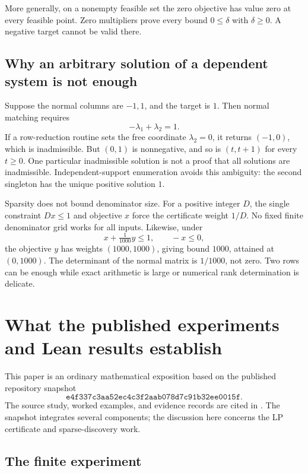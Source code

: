 \documentclass[11pt,letterpaper]{article}
\theoremstyle{definition}
\theoremstyle{remark}
\numberwithin{equation}{section}
\begin{document}
More generally, on a nonempty feasible set the zero objective has value
zero at every feasible point. Zero multipliers prove every bound
\(0\le\delta\) with \(\delta\ge0\). A negative target cannot be valid there.

\subsection{Why an arbitrary solution of a dependent system is not enough}

Suppose the normal columns are \(-1,1\), and the target is \(1\).
Then normal matching requires
\[
 -\lambda_1+\lambda_2=1.
\]
If a row-reduction routine sets the free coordinate \(\lambda_2=0\),
it returns \((-1,0)\), which is inadmissible. But \((0,1)\) is nonnegative,
and so is \((t,t+1)\) for every \(t\ge0\).
One particular inadmissible solution is not a proof that all solutions are
inadmissible. Independent-support enumeration avoids this ambiguity:
the second singleton has the unique positive solution \(1\).

Sparsity does not bound denominator size. For a positive integer \(D\), the
single constraint \(Dx\le1\) and objective \(x\) force the certificate
weight \(1/D\). No fixed finite denominator grid works for all inputs.
Likewise, under
\[
 x+\tfrac1{1000}y\le1,\qquad -x\le0,
\]
the objective \(y\) has weights \((1000,1000)\), giving bound \(1000\),
attained at \((0,1000)\).
The determinant of the normal matrix is \(1/1000\), not zero.
Two rows can be enough while exact arithmetic is large or numerical
rank determination is delicate.

\section{What the published experiments and Lean results establish}
\label{sec:evidence}

This paper is an ordinary mathematical exposition based on the published
repository snapshot
\[
 \texttt{e4f337c3aa52ec4c3f2aab078d7c91b32ee0015f}.
\]
The source study, worked examples, and evidence records are cited in
\cite{study,toolkit,round}. The snapshot integrates several components;
the discussion here concerns the LP certificate and sparse-discovery work.

\subsection{The finite experiment}
\end{document}
